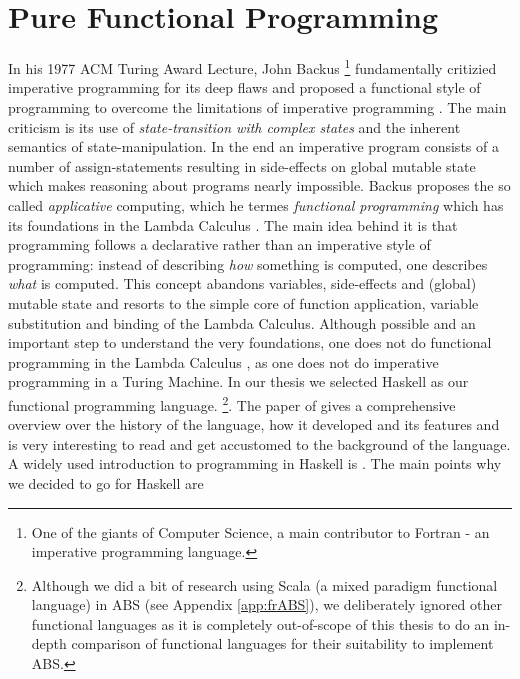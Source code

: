 \section{Pure Functional Programming}
In his 1977 ACM Turing Award Lecture, John Backus \footnote{One of the giants of Computer Science, a main contributor to Fortran - an imperative programming language.} fundamentally critizied imperative programming for its deep flaws and proposed a functional style of programming to overcome the limitations of imperative programming \cite{backus_can_1978}. The main criticism is its use of \textit{state-transition with complex states} and the inherent semantics of state-manipulation. In the end an imperative program consists of a number of assign-statements resulting in side-effects on global mutable state which makes reasoning about programs nearly impossible. Backus proposes the so called \textit{applicative} computing, which he termes \textit{functional programming} which has its foundations in the Lambda Calculus \cite{church_calculi_1941}. The main idea behind it is that programming follows a declarative rather than an imperative style of programming: instead of describing \textit{how} something is computed, one describes \textit{what} is computed. This concept abandons variables, side-effects and (global) mutable state and resorts to the simple core of function application, variable substitution and binding of the Lambda Calculus. Although possible and an important step to understand the very foundations, one does not do functional programming in the Lambda Calculus \cite{michaelson_introduction_2011}, as one does not do imperative programming in a Turing Machine.
In our thesis we selected Haskell as our functional programming language. \footnote{Although we did a bit of research using Scala (a mixed paradigm functional language) in ABS (see Appendix \ref{app:frABS}), we deliberately ignored other functional languages as it is completely out-of-scope of this thesis to do an in-depth comparison of functional languages for their suitability to implement ABS.}. The paper of \cite{hudak_history_2007} gives a comprehensive overview over the history of the language, how it developed and its features and is very interesting to read and get accustomed to the background of the language. A widely used introduction to programming in Haskell is \cite{hutton_programming_2016}. The main points why we decided to go for Haskell are

